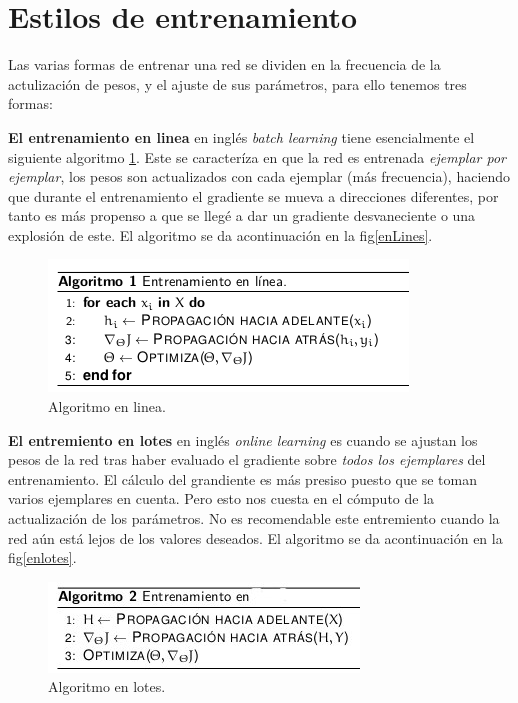 \section{Estilos de entrenamiento}

Las varias formas de entrenar una red se dividen en la frecuencia de la actulización de pesos, y el ajuste de sus parámetros, para ello tenemos tres formas:

\textbf{El entrenamiento en linea} en inglés \emph{batch learning} tiene esencialmente el siguiente algoritmo \ref{fig:enLinea}. Este se caracteríza en que la red es entrenada \emph{ejemplar por ejemplar}, los pesos son actualizados con cada ejemplar (más frecuencia), haciendo que durante el entrenamiento el gradiente se mueva a direcciones diferentes, por tanto es más propenso a que se llegé a dar un gradiente desvaneciente o una explosión de este. El algoritmo se da acontinuación en la fig\ref{enLines}.

\begin{figure}[H]
 \centering
 \includegraphics[scale=0.5]{../Figuras/enlinea.png}
 \caption{Algoritmo en linea.}
 \label{fig:enLinea}
\end{figure}

\textbf{El entremiento en lotes} en inglés \emph{online learning} es cuando se ajustan los pesos de la red tras haber evaluado el gradiente sobre \emph{todos los ejemplares} del entrenamiento. El cálculo del grandiente es más presiso puesto que se toman varios ejemplares en cuenta. Pero esto nos cuesta en el cómputo de la actualización de los parámetros. No es recomendable este entremiento cuando la red aún está lejos de los valores deseados. El algoritmo se da acontinuación en la fig\ref{enlotes}.

\begin{figure}[H]
 \centering
 \includegraphics[scale=0.8]{../Figuras/algoritmoLotes.jpg}
 \caption{Algoritmo en lotes.}
 \label{fig:enLotes}
\end{figure}

